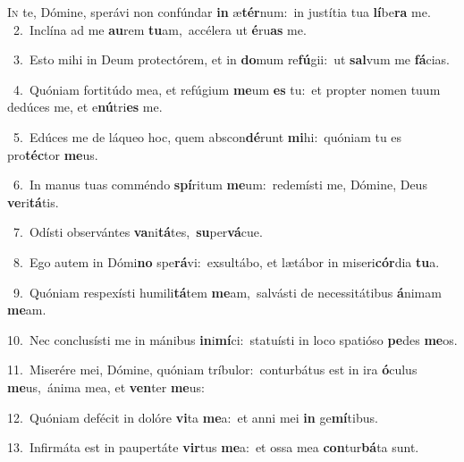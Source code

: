 \lettrine{\initial\textcolor{\initialcolor}{I}}{n} te, Dómine, sperávi non confúndar \textbf{in} æ\-\textbf{tér}\-num:~\star in justítia tua \textbf{lí}\-be\textbf{ra} me.\\
{\numbfont\textcolor{\numbcolor}{~2.}}~Inclína ad me \textbf{au}\-rem \textbf{tu}\-am,~\star accélera ut \textbf{é}\-ru\textbf{as} me.\par
{\numbfont\textcolor{\numbcolor}{~3.}}~Esto mihi in Deum protectórem, et in \textbf{do}\-mum re\-\textbf{fú}\-gii:~\star ut \textbf{sal}\-vum me \textbf{fá}\-cias.\par
{\numbfont\textcolor{\numbcolor}{~4.}}~Quóniam fortitúdo mea, et refúgium \textbf{me}\-um \textbf{es} tu:~\star et propter nomen tuum dedúces me, et e\-\textbf{nú}\-tri\textbf{es} me.\par
{\numbfont\textcolor{\numbcolor}{~5.}}~Edúces me de láqueo hoc, quem abscon\-\textbf{dé}\-runt \textbf{mi}\-hi:~\star quóniam tu es pro\-\textbf{téc}\-tor \textbf{me}\-us.\par
{\numbfont\textcolor{\numbcolor}{~6.}}~In manus tuas comméndo \textbf{spí}\-ritum \textbf{me}\-um:~\star redemísti me, Dómine, Deus \textbf{ve}\-ri\-\textbf{tá}\-tis.\par
{\numbfont\textcolor{\numbcolor}{~7.}}~Odísti observántes \textbf{va}\-ni\-\textbf{tá}\-tes,~\star \textbf{su}\-per\-\textbf{vá}\-cue.\par
{\numbfont\textcolor{\numbcolor}{~8.}}~Ego autem in Dómi\textbf{no} spe\-\textbf{rá}\-vi:~\star exsultábo, et lætábor in miseri\-\textbf{cór}\-dia \textbf{tu}\-a.\par
{\numbfont\textcolor{\numbcolor}{~9.}}~Quóniam respexísti humili\-\textbf{tá}\-tem \textbf{me}\-am,~\star salvásti de necessitátibus \textbf{á}\-nimam \textbf{me}\-am.\par
{\numbfont\textcolor{\numbcolor}{10.}}~Nec conclusísti me in mánibus \textbf{in}\-i\-\textbf{mí}\-ci:~\star statuísti in loco spatióso \textbf{pe}\-des \textbf{me}\-os.\par
{\numbfont\textcolor{\numbcolor}{11.}}~Miserére mei, Dómine, quóniam tríbulor:~\dagger conturbátus est in ira \textbf{ó}\-culus \textbf{me}\-us,~\star ánima mea, et \textbf{ven}\-ter \textbf{me}\-us:\par
{\numbfont\textcolor{\numbcolor}{12.}}~Quóniam defécit in dolóre \textbf{vi}\-ta \textbf{me}\-a:~\star et anni mei \textbf{in} ge\-\textbf{mí}\-tibus.\par
{\numbfont\textcolor{\numbcolor}{13.}}~Infirmáta est in paupertáte \textbf{vir}\-tus \textbf{me}\-a:~\star et ossa mea \textbf{con}\-tur\-\textbf{bá}\-ta sunt.\par
